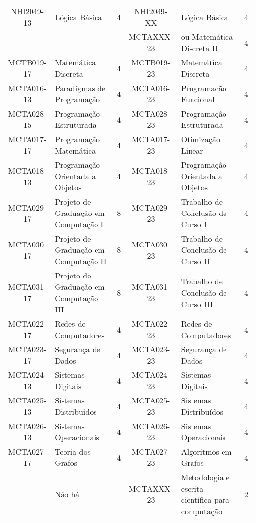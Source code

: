 \begin{table}[h!]
{\begin{tabular}{|c|p{}|c||c|p{}|c|}
    NHI2049-13 & Lógica Básica & 4 & NHI2049-XX & Lógica Básica & 4 \\
    & & & MCTAXXX-23 & ou Matemática Discreta II & 4 \\ \hline
    MCTB019-17 & Matemática Discreta & 4 & MCTB019-23 & Matemática Discreta & 4 \\ \hline
    MCTA016-13 & Paradigmas de Programação & 4 & MCTA016-23 & Programação Funcional & 4 \\ \hline
    MCTA028-15 & Programação Estruturada & 4 & MCTA028-23 & Programação Estruturada & 4 \\ \hline
    MCTA017-17 & Programação Matemática & 4 & MCTA017-23 & Otimização Linear & 4 \\ \hline
    MCTA018-13 & Programação Orientada a Objetos & 4 & MCTA018-23 & Programação Orientada a Objetos & 4 \\ \hline
    MCTA029-17 & Projeto de Graduação em Computação I & 8 & MCTA029-23 & Trabalho de Conclusão de Curso I & 4 \\ \hline
    MCTA030-17 & Projeto de Graduação em Computação II & 8 & MCTA030-23 & Trabalho de Conclusão de Curso II & 4 \\ \hline
    MCTA031-17 & Projeto de Graduação em Computação III & 8 & MCTA031-23 & Trabalho de Conclusão de Curso III & 4 \\ \hline
    MCTA022-17 & Redes de Computadores & 4 & MCTA022-23 & Redes de Computadores & 4 \\ \hline
    MCTA023-17 & Segurança de Dados & 4 & MCTA023-23 & Segurança de Dados & 4 \\ \hline
    MCTA024-13 & Sistemas Digitais & 4 & MCTA024-23 & Sistemas Digitais & 4 \\ \hline
    MCTA025-13 & Sistemas Distribuídos & 4 & MCTA025-23 & Sistemas Distribuídos & 4 \\ \hline
    MCTA026-13 & Sistemas Operacionais & 4 & MCTA026-23 & Sistemas Operacionais & 4 \\ \hline
    MCTA027-17 & Teoria dos Grafos & 4 & MCTA027-23 & Algoritmos em Grafos & 4 \\ \hline
     & Não há & & MCTAXXX-23 & Metodologia e escrita científica para computação & 2 \\ \hline
\end{tabular}
}
\end{table}

